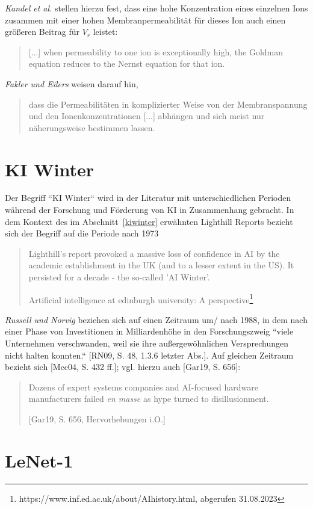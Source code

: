 {\textit{Kandel et al.} stellen hierzu fest, dass eine hohe Konzentration eines einzelnen Ions zusammen mit einer hohen Membranpermeabilität für dieses Ion auch einen größeren Beitrag für $V_r$ leistet:

\blockquote[{\cite[135]{KSJ+13}}]{
    {[...]} when permeability to one ion is exceptionally high, the Goldman equation reduces to the Nernst equation for that ion.
}

\textit{Fakler und Eilers} weisen darauf hin,

\blockquote[{\cite[67]{FE19}}]{
    dass die Permeabilitäten in komplizierter Weise von der Membranspannung und den Ionenkonzentrationen {[...]} abhängen und sich meist nur näherungsweise bestimmen lassen.
}




\section{KI Winter}\label{appendix:kiwinter}

Der Begriff ``KI Winter`` wird in der Literatur mit unterschiedlichen Perioden während der Forschung und Förderung von KI in Zusammenhang gebracht.
In dem Kontext des im Abschnitt~\ref{kiwinter} erwähnten Lighthill Reports bezieht sich der Begriff auf die Periode nach 1973

\blockquote[Artificial intelligence at edinburgh university: A perspective\footnote{https://www.inf.ed.ac.uk/about/AIhistory.html, abgerufen 31.08.2023}]{
    Lighthill's report provoked a massive loss of confidence in AI by the academic establishment in the UK (and to a lesser extent in the US). It persisted for a decade - the so-called 'AI Winter'.
}

\noindent
\textit{Russell und Norvig} beziehen sich auf einen Zeitraum um/ nach 1988, in dem nach einer Phase von Investitionen in Milliardenhöhe in den Forschungszweig ``viele Unternehmen verschwanden, weil sie ihre außergewöhnlichen Versprechungen nicht halten konnten.`` [RN09, S. 48, 1.3.6 letzter Abs.]. Auf gleichen Zeitraum bezieht sich [Mcc04, S. 432 ff.]; vgl. hierzu auch [Gar19, S. 656]:

\blockquote[{[Gar19, S. 656, Hervorhebungen i.O.]}]{
    Dozens of expert systems companies and AI-focused hardware manufacturers failed \textit{en masse} as hype turned to disillusionment.
}



\section{LeNet-1}\label{appendix:lenet1}

}
